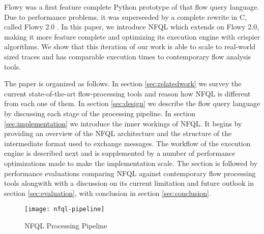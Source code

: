 Flowy \cite{kkanev:2010} was a first feature complete Python prototype of that
flow query language. Due to performance problems, it was superseeded by a
complete rewrite in C, called Flowy 2.0 \cite{jschauer:thesis:2011}. In this
paper, we introduce \ac{NFQL} which extends on Flowy 2.0, making it more
feature complete and optimizing its execution engine with crispier algorithms.
We show that this iteration of our work is able to scale to real-world sized
traces and has comparable execution times to contemporary flow analysis tools.

The paper is organized as follows. In section \ref{sec:relatedwork} we survey
the current state-of-the-art flow-processing tools and reason how \ac{NFQL} is
different from each one of them. In section \ref{sec:design} we describe the
flow query language by discussing each stage of the processing pipeline. In
section \ref{sec:implementation} we introduce the inner workings of \ac{NFQL}.
It begins by providing an overview of the \ac{NFQL} architecture and the
structure of the intermediate format used to exchange messages. The workflow of
the execution engine is described next and is supplemented by a number of
performance optimizations made to make the implementation scale. The section is
followed by performance evaluations comparing \ac{NFQL} against contemporary
flow processing tools alongwith with a discussion on its current limitation and
future outlook in section \ref{sec:evaluation}, with conclusion in section
\ref{sec:conclusion}.

\begin{figure*}[!t]
\centering
\texttt{[image: nfql-pipeline]}
\caption{NFQL Processing Pipeline \cite{vmarinov:2009}}
\label{fig:nfql-pipeline}
\end{figure*}
